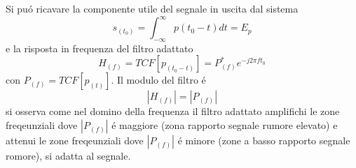         \begin{figure}[H]
            \centering
            \hfill
        \end{figure}
        Si puó ricavare la componente utile del segnale in uscita dal sistema
        \[
            s_{(t_0)} = \int_{-\infty}^{\infty} p{(t_0-t)}dt = E_p  
        \]
        e la risposta in frequenza del filtro adattato
        \[
            H_{(f)} = TCF[p_{(t_0-t)}] = P^*_{(f)}e^{-j2\pi ft_0}    
        \]
        con $P_(f) = TCF[p_{(t)}]$. Il modulo del filtro é 
        \[
            \left|H_{(f)}\right| = \left|P_{(f)}\right|   
        \] 
        si osserva come nel domino della frequenza il filtro adattato amplifichi le zone freqeunziali dove $ \left|P_{(f)}\right|$
        é maggiore (zona rapporto segnale rumore elevato) e attenui le zone freqeunziali dove $ \left|P_{(f)}\right|$ é minore 
        (zone a basso rapporto segnale romore), si adatta al segnale.

